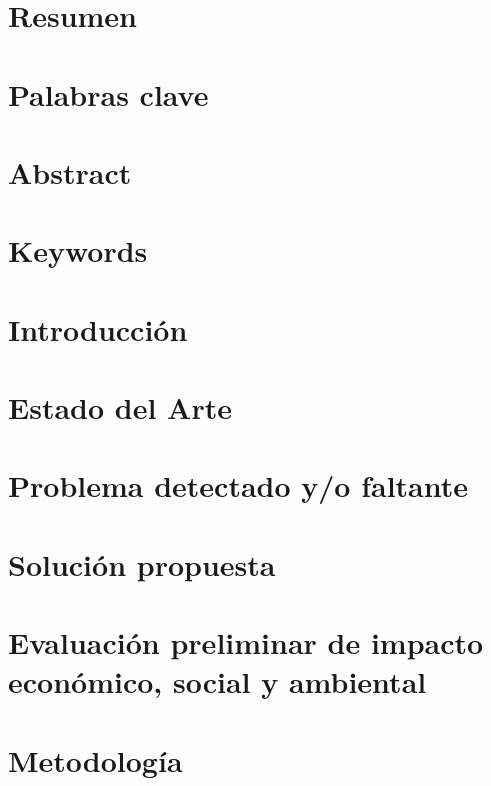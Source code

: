 \documentclass[a4paper,11pt]{article}
\begin{document}


\tableofcontents
\newpage

\section{Resumen}

\newpage

\section{Palabras clave}

\newpage

\section{Abstract}

\newpage

\section{Keywords}

\newpage

\section{Introducción}

\newpage

\section{Estado del Arte}

\newpage

\section{Problema detectado y/o faltante}

\newpage

\section{Solución propuesta}

\newpage

\section{Evaluación preliminar de impacto económico, social y ambiental}

\newpage

\section{Metodología}

\newpage
\end{document}
